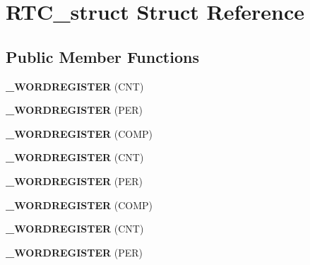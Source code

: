 \hypertarget{struct_r_t_c__struct}{}\section{R\+T\+C\+\_\+struct Struct Reference}
\label{struct_r_t_c__struct}
\subsection*{Public Member Functions}
\begin{DoxyCompactItemize}
\item 
{\bfseries \+\_\+\+W\+O\+R\+D\+R\+E\+G\+I\+S\+T\+ER} (C\+NT)\hypertarget{struct_r_t_c__struct_a11c40ba57f4465d2a707b78b48195337}{}\label{struct_r_t_c__struct_a11c40ba57f4465d2a707b78b48195337}

\item 
{\bfseries \+\_\+\+W\+O\+R\+D\+R\+E\+G\+I\+S\+T\+ER} (P\+ER)\hypertarget{struct_r_t_c__struct_a9080efcafdb424be97377c2d9ff8a7b7}{}\label{struct_r_t_c__struct_a9080efcafdb424be97377c2d9ff8a7b7}

\item 
{\bfseries \+\_\+\+W\+O\+R\+D\+R\+E\+G\+I\+S\+T\+ER} (C\+O\+MP)\hypertarget{struct_r_t_c__struct_a59d429b175b898b84d1028fd04915835}{}\label{struct_r_t_c__struct_a59d429b175b898b84d1028fd04915835}

\item 
{\bfseries \+\_\+\+W\+O\+R\+D\+R\+E\+G\+I\+S\+T\+ER} (C\+NT)\hypertarget{struct_r_t_c__struct_a11c40ba57f4465d2a707b78b48195337}{}\label{struct_r_t_c__struct_a11c40ba57f4465d2a707b78b48195337}

\item 
{\bfseries \+\_\+\+W\+O\+R\+D\+R\+E\+G\+I\+S\+T\+ER} (P\+ER)\hypertarget{struct_r_t_c__struct_a9080efcafdb424be97377c2d9ff8a7b7}{}\label{struct_r_t_c__struct_a9080efcafdb424be97377c2d9ff8a7b7}

\item 
{\bfseries \+\_\+\+W\+O\+R\+D\+R\+E\+G\+I\+S\+T\+ER} (C\+O\+MP)\hypertarget{struct_r_t_c__struct_a59d429b175b898b84d1028fd04915835}{}\label{struct_r_t_c__struct_a59d429b175b898b84d1028fd04915835}

\item 
{\bfseries \+\_\+\+W\+O\+R\+D\+R\+E\+G\+I\+S\+T\+ER} (C\+NT)\hypertarget{struct_r_t_c__struct_a11c40ba57f4465d2a707b78b48195337}{}\label{struct_r_t_c__struct_a11c40ba57f4465d2a707b78b48195337}

\item 
{\bfseries \+\_\+\+W\+O\+R\+D\+R\+E\+G\+I\+S\+T\+ER} (P\+ER)\hypertarget{struct_r_t_c__struct_a9080efcafdb424be97377c2d9ff8a7b7}{}\label{struct_r_t_c__struct_a9080efcafdb424be97377c2d9ff8a7b7}


\end{DoxyCompactItemize}
